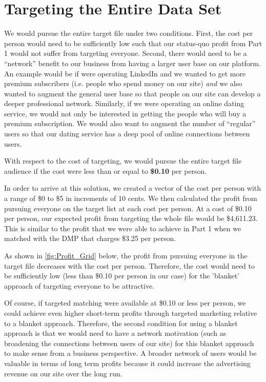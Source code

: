 \section{Targeting the Entire Data Set} %
We would pursue the entire target file under two conditions. First, the cost per person would need to be sufficiently low such that our status-quo profit from Part 1 would not suffer from targeting everyone. Second, there would need to be a “network” benefit to our business from having a larger user base on our platform. An example would be if were operating LinkedIn and we wanted to get more premium subscribers (i.e. people who spend money on our site) \textit{and} we also wanted to augment the general user base so that people on our site can develop a deeper professional network. Similarly, if we were operating an online dating service, we would not only be interested in getting the people who will buy a premium subscription. We would also want to augment the number of “regular” users so that our dating service has a deep pool of online connections between users.

With respect to the cost of targeting, we would pursue the entire target file audience if the cost were less than or equal to \textbf{\$0.10} per person.

In order to arrive at this solution, we created a vector of the cost per person with a range of \$0 to \$5 in increments of 10 cents. We then calculated the profit from pursuing everyone on the target list at each cost per person. At a cost of \$0.10 per person, our expected profit from targeting the whole file would be \$4,611.23. This is similar to the profit that we were able to achieve in Part 1 when we matched with the DMP that charges \$3.25 per person.

As shown in \cref{fig:Profit_Grid} below, the profit from pursuing everyone in the target file decreases with the cost per person. Therefore, the cost would need to be sufficiently low (less than \$0.10 per person in our case) for the 'blanket' approach of targeting everyone to be attractive. 

Of course, if targeted matching were available at \$0.10 or less per person, we could achieve even higher short-term profits through targeted marketing relative to a blanket approach. Therefore, the second condition for using a blanket approach is that we would need to have a network motivation (such as broadening the connections between users of our site) for this blanket approach to make sense from a business perspective. A broader network of users would be valuable in terms of long term profits because it could increase the advertising revenue on our site over the long run.

